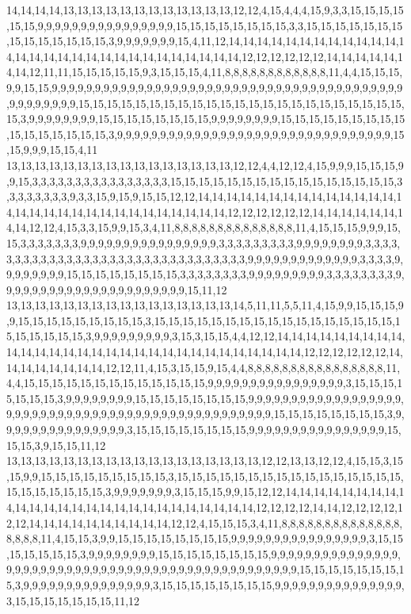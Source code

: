 14,14,14,14,13,13,13,13,13,13,13,13,13,13,13,13,12,12,4,15,4,4,4,15,9,3,3,15,15,15,15,15,15,9,9,9,9,9,9,9,9,9,9,9,9,9,9,9,9,15,15,15,15,15,15,15,15,3,3,15,15,15,15,15,15,15,15,15,15,15,15,15,15,3,9,9,9,9,9,9,9,15,4,11,12,14,14,14,14,14,14,14,14,14,14,14,14,14,14,14,14,14,14,14,14,14,14,14,14,14,14,14,14,14,12,12,12,12,12,12,14,14,14,14,14,14,14,12,11,11,15,15,15,15,15,9,3,15,15,15,4,11,8,8,8,8,8,8,8,8,8,8,8,8,11,4,4,15,15,15,9,9,15,15,9,9,9,9,9,9,9,9,9,9,9,9,9,9,9,9,9,9,9,9,9,9,9,9,9,9,9,9,9,9,9,9,9,9,9,9,9,9,9,9,9,9,9,9,9,9,9,9,9,15,15,15,15,15,15,15,15,15,15,15,15,15,15,15,15,15,15,15,15,15,15,15,15,3,9,9,9,9,9,9,9,9,15,15,15,15,15,15,15,15,9,9,9,9,9,9,9,9,15,15,15,15,15,15,15,15,15,15,15,15,15,15,15,15,3,9,9,9,9,9,9,9,9,9,9,9,9,9,9,9,9,9,9,9,9,9,9,9,9,9,9,9,9,9,9,9,9,15,15,9,9,9,15,15,4,11
13,13,13,13,13,13,13,13,13,13,13,13,13,13,13,13,12,12,4,4,12,12,4,15,9,9,9,15,15,15,9,9,15,3,3,3,3,3,3,3,3,3,3,3,3,3,3,3,3,15,15,15,15,15,15,15,15,15,15,15,15,15,15,15,15,3,3,3,3,3,3,3,3,9,3,3,15,9,15,9,15,15,12,12,14,14,14,14,14,14,14,14,14,14,14,14,14,14,14,14,14,14,14,14,14,14,14,14,14,14,14,14,14,14,12,12,12,12,12,12,14,14,14,14,14,14,14,14,12,12,4,15,3,3,15,9,9,15,3,4,11,8,8,8,8,8,8,8,8,8,8,8,8,8,8,11,4,15,15,15,9,9,9,15,15,3,3,3,3,3,3,3,9,9,9,9,9,9,9,9,9,9,9,9,9,9,9,9,3,3,3,3,3,3,3,3,3,9,9,9,9,9,9,9,9,3,3,3,3,3,3,3,3,3,3,3,3,3,3,3,3,3,3,3,3,3,3,3,3,3,3,3,3,3,3,3,3,9,9,9,9,9,9,9,9,9,9,9,9,9,3,3,3,3,9,9,9,9,9,9,9,9,15,15,15,15,15,15,15,15,3,3,3,3,3,3,3,3,9,9,9,9,9,9,9,9,9,3,3,3,3,3,3,3,3,9,9,9,9,9,9,9,9,9,9,9,9,9,9,9,9,9,9,9,9,9,9,15,11,12
13,13,13,13,13,13,13,13,13,13,13,13,13,13,13,13,14,5,11,11,5,5,11,4,15,9,9,15,15,15,9,9,15,15,15,15,15,15,15,15,15,3,15,15,15,15,15,15,15,15,15,15,15,15,15,15,15,15,15,15,15,15,15,15,15,3,9,9,9,9,9,9,9,9,9,3,15,3,15,15,4,4,12,12,14,14,14,14,14,14,14,14,14,14,14,14,14,14,14,14,14,14,14,14,14,14,14,14,14,14,14,14,14,14,12,12,12,12,12,12,14,14,14,14,14,14,14,14,12,12,11,4,15,3,15,15,9,15,4,4,8,8,8,8,8,8,8,8,8,8,8,8,8,8,8,8,11,4,4,15,15,15,15,15,15,15,15,15,15,15,15,15,9,9,9,9,9,9,9,9,9,9,9,9,9,9,9,9,3,15,15,15,15,15,15,15,3,9,9,9,9,9,9,9,9,15,15,15,15,15,15,15,15,9,9,9,9,9,9,9,9,9,9,9,9,9,9,9,9,9,9,9,9,9,9,9,9,9,9,9,9,9,9,9,9,9,9,9,9,9,9,9,9,9,9,9,9,9,9,9,9,9,15,15,15,15,15,15,15,15,3,9,9,9,9,9,9,9,9,9,9,9,9,9,9,9,3,15,15,15,15,15,15,15,15,9,9,9,9,9,9,9,9,9,9,9,9,9,9,9,9,15,15,15,3,9,15,15,11,12
13,13,13,13,13,13,13,13,13,13,13,13,13,13,13,13,13,13,12,12,13,13,12,12,4,15,15,3,15,15,9,9,15,15,15,15,15,15,15,15,15,3,15,15,15,15,15,15,15,15,15,15,15,15,15,15,15,15,15,15,15,15,15,15,15,3,9,9,9,9,9,9,9,3,15,15,15,9,9,15,12,12,14,14,14,14,14,14,14,14,14,14,14,14,14,14,14,14,14,14,14,14,14,14,14,14,14,14,12,12,12,12,14,14,12,12,12,12,12,12,14,14,14,14,14,14,14,14,14,14,12,12,4,15,15,15,3,4,11,8,8,8,8,8,8,8,8,8,8,8,8,8,8,8,8,8,8,11,4,15,15,3,9,9,15,15,15,15,15,15,15,15,9,9,9,9,9,9,9,9,9,9,9,9,9,9,9,9,3,15,15,15,15,15,15,15,3,9,9,9,9,9,9,9,9,15,15,15,15,15,15,15,15,9,9,9,9,9,9,9,9,9,9,9,9,9,9,9,9,9,9,9,9,9,9,9,9,9,9,9,9,9,9,9,9,9,9,9,9,9,9,9,9,9,9,9,9,9,9,9,9,9,15,15,15,15,15,15,15,15,3,9,9,9,9,9,9,9,9,9,9,9,9,9,9,9,3,15,15,15,15,15,15,15,15,9,9,9,9,9,9,9,9,9,9,9,9,9,9,9,3,15,15,15,15,15,15,15,11,12
